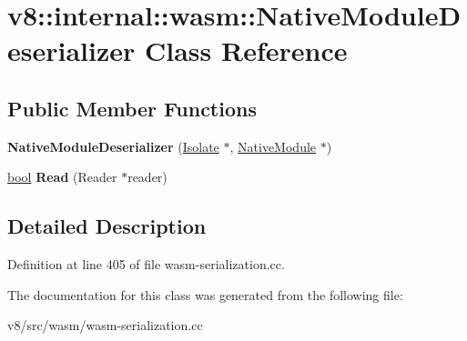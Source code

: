 \hypertarget{classv8_1_1internal_1_1wasm_1_1NativeModuleDeserializer}{}\section{v8\+:\+:internal\+:\+:wasm\+:\+:Native\+Module\+Deserializer Class Reference}
\label{classv8_1_1internal_1_1wasm_1_1NativeModuleDeserializer}
\subsection*{Public Member Functions}
\begin{DoxyCompactItemize}
\item 
\mbox{\label{classv8_1_1internal_1_1wasm_1_1NativeModuleDeserializer_a22ca057811a2a94aa98ec70dd0418077}} 
{\bfseries Native\+Module\+Deserializer} (\mbox{\hyperlink{classv8_1_1internal_1_1Isolate}{Isolate}} $\ast$, \mbox{\hyperlink{classv8_1_1internal_1_1wasm_1_1NativeModule}{Native\+Module}} $\ast$)
\item 
\mbox{\label{classv8_1_1internal_1_1wasm_1_1NativeModuleDeserializer_a0288ab7e7299902a8105ecd4e4fa3d47}} 
\mbox{\hyperlink{classbool}{bool}} {\bfseries Read} (Reader $\ast$reader)
\end{DoxyCompactItemize}


\subsection{Detailed Description}


Definition at line 405 of file wasm-\/serialization.\+cc.



The documentation for this class was generated from the following file\+:\begin{DoxyCompactItemize}
\item 
v8/src/wasm/wasm-\/serialization.\+cc\end{DoxyCompactItemize}
